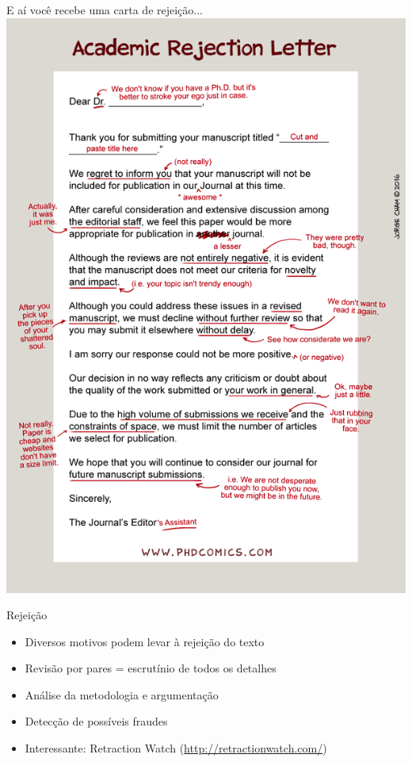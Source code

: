 \documentclass{beamer}
\begin{document}
\begin{frame}{E aí você recebe uma carta de rejeição...}
  \centering
  \includegraphics[height=\textheight]{Planejamento/phd071316s}
\end{frame}

\begin{frame}{Rejeição}
  \begin{itemize}
    \footnotesize
  \item Diversos motivos podem levar à rejeição do texto
    \medskip
  \item Revisão por pares = escrutínio de todos os detalhes
    \medskip
  \item Análise da metodologia e argumentação
    \medskip
  \item Detecção de possíveis fraudes
    \medskip
  \item Interessante: Retraction Watch (\url{http://retractionwatch.com/})
  \end{itemize}
\end{frame}
\end{document}
